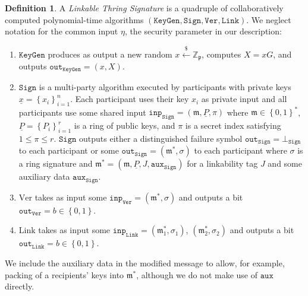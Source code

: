 \documentclass{mrl}
\theoremstyle{definition}
\numberwithin{theorem}{subsection}
\newtheorem{defn}[theorem]{Definition}
\newcommand{\scalarField}{\mathbb{Z}_{\mathfrak{p}}}
\newcommand{\m}{\mathfrak{m}}
\begin{document}
\begin{defn}
A \textit{Linkable Thring Signature} is a quadruple of collaboratively computed polynomial-time algorithms $(\texttt{KeyGen}, \texttt{Sign}, \texttt{Ver}, \texttt{Link})$. We neglect notation for the common input $\eta$, the security parameter in our description:

\begin{enumerate}

\item $\texttt{KeyGen}$ produces as output a new random $x \overset{\$}{\leftarrow} \scalarField$, computes $X = xG$, and outputs $\texttt{out}_{\texttt{KeyGen}} = (x,X)$.

\item $\texttt{Sign}$ is a multi-party algorithm executed by participants with private keys $\underline{x} = \left\{x_i\right\}_{i=1}^{n}$. Each participant uses their key $x_i$ as private input and all participants use some shared input $\texttt{inp}_{\texttt{Sign}} = (\m, \underline{P}, \pi)$ where $\m \in \left\{0,1\right\}^*$, $\underline{P} = \left\{P_i\right\}_{i=1}^{r}$ is a ring of public keys, and $\pi$ is a secret index satisfying $1 \leq \pi \leq r$. $\texttt{Sign}$ outputs either a distinguished failure symbol $\texttt{out}_{\texttt{Sign}} = \bot_{\texttt{Sign}}$ to each participant or some $\texttt{out}_{\texttt{Sign}} = (\m^*, \sigma)$ to each participant where  $\sigma$ is a ring signature and $\m^* = (\m, \underline{P}, J, \texttt{aux}_{\texttt{Sign}})$ for a linkability tag $J$ and some auxiliary data $\texttt{aux}_{\texttt{Sign}}$.



\item $\text{Ver}$ takes as input some $\texttt{inp}_{\texttt{Ver}} = (\m^*, \sigma)$ and outputs a bit $\texttt{out}_{\texttt{Ver}} = b \in \left\{0,1\right\}$. %

\item $\text{Link}$ takes as input some $\texttt{inp}_{\texttt{Link}} = (\m_1^*, \sigma_1)$, $(\m_2^*, \sigma_2)$ and outputs a bit $\texttt{out}_{\texttt{Link}} = b \in \left\{0,1\right\}$.

\end{enumerate} 
\end{defn} We include the auxiliary data in the modified message to allow, for example, packing of a recipients' keys into $\m^*$, although we do not make use of $\texttt{aux}$ directly.
\end{document}

